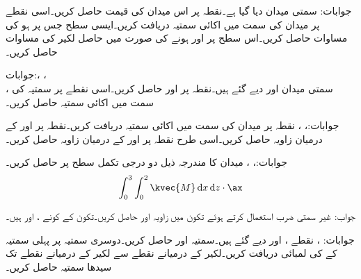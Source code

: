 جوابات:
سمتی میدان  دیا گیا ہے۔نقطہ  پر اس میدان کی قیمت حاصل کریں۔اسی نقطے پر میدان کی سمت میں اکائی سمتیہ دریافت کریں۔ایسی سطح جس پر  ہو کی مساوات حاصل کریں۔اس سطح پر  اور  ہونے کی صورت میں حاصل لکیر کی مساوات حاصل کریں۔

جوابات:، ، \\ ، 
سمتی میدان  اور  دیے گئے ہیں۔نقطہ  پر  اور  حاصل کریں۔اسی نقطے پر سمتیہ  کی سمت میں اکائی سمتیہ حاصل کریں۔

جوابات:، ، 
 نقطہ  پر میدان  کی سمت میں اکائی سمتیہ  دریافت کریں۔نقطہ  پر  اور  کے درمیان زاویہ حاصل کریں۔اسی طرح نقطہ  پر  اور  کے درمیان زاویہ حاصل کریں۔

جوابات:، ، 
میدان  کا مندرجہ ذیل دو درجی تکمل  سطح پر حاصل کریں۔
\begin{align*}
\int_{0}^{3} \int_{0}^{2} \kvec{M} \dif x \dif z\cdot \ax 
\end{align*}

جواب: 
غیر سمتی ضرب استعمال کرتے ہوئے تکون  میں زاویہ  اور  حاصل کریں۔تکون کے کونے ،  اور
  ہیں۔

جوابات: ، 
نقطے ،  اور  دیے گئے ہیں۔سمتیہ  اور  حاصل کریں۔دوسری سمتیہ  پر  پہلی سمتیہ کے  کی لمبائی دریافت کریں۔لکیر  کے درمیانے نقطے سے لکیر  کے درمیانے نقطے تک سیدھا سمتیہ حاصل کریں۔

